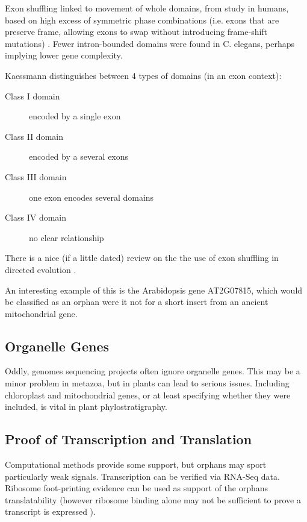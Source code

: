 Exon shuffling linked to movement of whole domains, from study in humans, based
on high excess of symmetric phase combinations (i.e. exons that are preserve
frame, allowing exons to swap without introducing frame-shift mutations)
\cite{kaessmann_signatures_2002}. Fewer intron-bounded domains were found in C.
elegans, perhaps implying lower gene complexity.

Kaessmann distinguishes between 4 types of domains (in an exon context):
\begin{description}
    \item[Class I domain] encoded by a single exon 
    \item[Class II domain] encoded by a several exons
    \item[Class III domain] one exon encodes several domains
    \item[Class IV domain] no clear relationship
\end{description}

There is a nice (if a little dated) review on the the use of exon shuffling in
directed evolution \cite{kolkman_directed_2001}.


An interesting example of this is the Arabidopsis gene AT2G07815, which would
be classified as an orphan were it not for a short insert from an ancient
mitochondrial gene.


\subsection{Organelle Genes}

Oddly, genomes sequencing projects often ignore organelle genes. This may be a
minor problem in metazoa, but in plants can lead to serious issues. Including
chloroplast and mitochondrial genes, or at least specifying whether they were
included, is vital in plant phylostratigraphy.

\subsection{Proof of Transcription and Translation}

Computational methods provide some support, but orphans may sport particularly
weak signals.  Transcription can be verified via RNA-Seq data. Ribosome
foot-printing evidence can be used as support of the orphans translatability
(however ribosome binding alone may not be sufficient to prove a transcript is
expressed \cite{guttman_ribosome_2013}).

